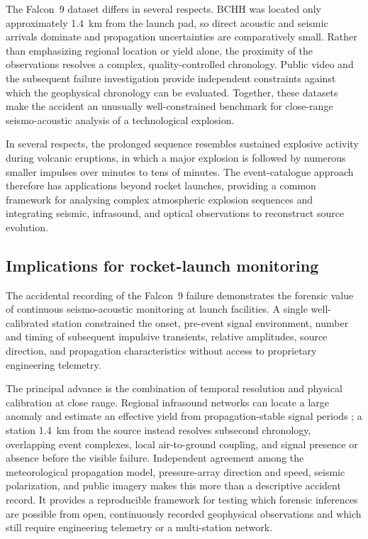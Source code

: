 \documentclass[]{seismica}
\begin{document}
The Falcon~9 dataset differs in several respects. BCHH was located only
approximately 1.4~km from the launch pad, so direct acoustic and seismic
arrivals dominate and propagation uncertainties are comparatively small.
Rather than emphasizing regional location or yield alone, the proximity of the
observations resolves a complex, quality-controlled chronology. Public video
and the subsequent failure investigation
provide independent constraints against which the geophysical chronology can
be evaluated. Together, these datasets make the accident an unusually
well-constrained benchmark for close-range seismo-acoustic analysis of a
technological explosion.

In several respects, the prolonged sequence resembles sustained explosive activity during volcanic eruptions, in which a major explosion is followed by numerous smaller impulses over minutes to tens of minutes. The event-catalogue approach therefore has applications beyond rocket launches, providing a common framework for analysing complex atmospheric explosion sequences and integrating seismic, infrasound, and optical observations to reconstruct source evolution.

\subsection{Implications for rocket-launch monitoring}
\label{sec:discussion_monitoring}

The accidental recording of the Falcon~9 failure demonstrates the forensic
value of continuous seismo-acoustic monitoring at launch facilities. A single
well-calibrated station constrained the onset, pre-event signal environment,
number and timing of subsequent impulsive transients, relative
amplitudes, source direction, and propagation characteristics without access to
proprietary engineering telemetry.

The principal advance is the combination of temporal resolution and physical
calibration at close range. Regional infrasound networks can locate a
large anomaly and estimate an effective yield from propagation-stable signal
periods \citep{silber_scamfer_newglenn_2026}; a station 1.4~km from the source
instead resolves subsecond chronology, overlapping event complexes, local
air-to-ground coupling, and signal presence or absence before the visible
failure. Independent agreement among the meteorological propagation model,
pressure-array direction and speed, seismic polarization, and public imagery
makes this more than a descriptive accident record. It provides a reproducible
framework for testing which forensic inferences are possible from open,
continuously recorded geophysical observations and which still require
engineering telemetry or a multi-station network.
\end{document}
